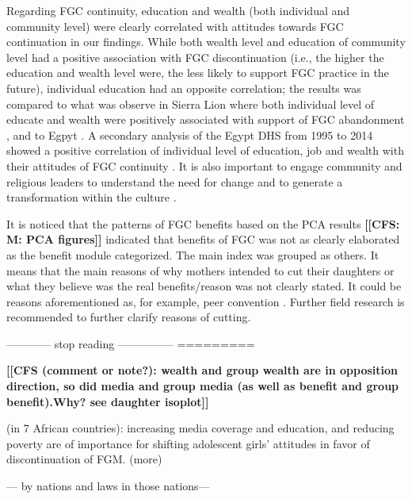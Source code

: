 \documentclass[12pt,]{article}
\newcommand{\comment}[1]{\textbf{[[#1]]}}
\newcommand{\cfcmt}[1]{\comment{CFS: #1}}
\newcommand{\cf}[1]{\comment{CFS (comment or note?): #1}}
\begin{document}
Regarding FGC continuity, education and wealth (both individual and community level) were clearly correlated with attitudes towards FGC continuation in our findings.  While both wealth level and education of community level had a positive association with FGC discontinuation (i.e., the higher the education and wealth level were, the less likely to support FGC practice in the future), individual education had an opposite correlation; the results was compared to what was observe in Sierra Lion where both individual level of educate and wealth were positively associated with support of FGC abandonment \cite{Sagn14}, and to Egpyt \cite{DalaLawo10, VanMeek16}. A secondary analysis of the Egypt DHS from 1995 to 2014 showed a positive correlation of individual level of education, job and wealth with their attitudes of FGC continuity \cite{VanMeek15} .  It is also important to engage community and religious leaders to understand the need for change and to generate a transformation within the culture \cite{KleiHelz18}.

It is noticed that the patterns of FGC benefits based on the PCA results \cfcmt{M: PCA figures} indicated that benefits of FGC was not as clearly elaborated as the benefit module categorized.  The main index was grouped as others.  It means that the main reasons of why mothers intended to cut their daughters or what they believe was the real benefits/reason was not clearly stated. It could be reasons aforementioned as, for example, peer convention \cite{GrosHayd19CONFIRM, ShelWand11}.  Further field research is recommended to further clarify reasons of cutting.


———— stop reading —————
=========






\cf{wealth and group wealth are in opposition direction, so did media and group media (as well as benefit and group benefit).Why?  see daughter isoplot}



\cite{DalaKalm18}(in 7 African countries): increasing media coverage and education, and reducing poverty are of importance for shifting adolescent girls' attitudes in favor of discontinuation of FGM.
\cite{Hayf05, PashPonn16} (more) %



— by nations and laws in those nations—
\end{document}
